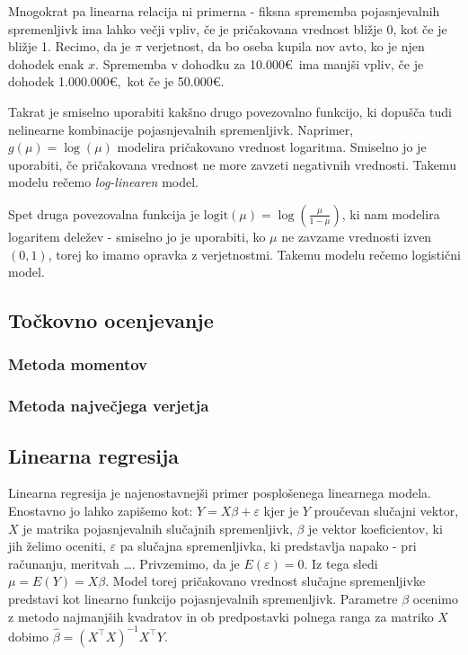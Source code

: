 \documentclass[12pt,a4paper]{amsart}
\theoremstyle{definition} %
\theoremstyle{plain} %
\begin{document}
Mnogokrat pa linearna relacija ni primerna - fiksna sprememba pojasnjevalnih spremenljivk ima lahko večji vpliv, če je pričakovana vrednost 
bližje 0, kot če je bližje 1. Recimo, da je $\pi$ verjetnost, da bo oseba kupila nov avto, ko je njen dohodek enak $x$. Sprememba v dohodku
za 10.000\euro~ima manjši vpliv, če je dohodek 1.000.000\euro,~kot če je 50.000\euro.

Takrat je smiselno uporabiti kakšno drugo povezovalno funkcijo, ki dopušča tudi nelinearne kombinacije pojasnjevalnih
spremenljivk. Naprimer, $g(\mu) = \log(\mu)$ modelira
pričakovano vrednost logaritma. Smiselno jo je uporabiti, če pričakovana vrednost ne more zavzeti negativnih vrednosti. Takemu modelu rečemo
\textit{log-linearen} model.

Spet druga povezovalna funkcija je $\mathrm{logit}(\mu) = \log(\frac{\mu}{1-\mu})$, ki nam modelira logaritem deležev - smiselno jo je uporabiti, 
ko $\mu$ ne zavzame vrednosti izven $(0,1)$, torej ko imamo opravka z verjetnostmi. Takemu modelu rečemo logistični model.

\subsection{Točkovno ocenjevanje}
\subsubsection{Metoda momentov}
\subsubsection{Metoda največjega verjetja}
\subsection{Linearna regresija}

Linearna regresija je najenostavnejši primer posplošenega linearnega modela. Enostavno jo lahko zapišemo kot:
$
    Y = X \beta + \varepsilon
$
kjer je $Y$ proučevan slučajni vektor, $X$ je matrika pojasnjevalnih slučajnih spremenljivk, $\beta$ je vektor koeficientov, ki jih želimo oceniti,
$\varepsilon$ pa slučajna spremenljivka, ki predstavlja napako - pri računanju, meritvah \ldots. Privzemimo, da je $E(\varepsilon) = 0$. Iz tega sledi
$\mu = E(Y) = X\beta$. Model torej pričakovano vrednost slučajne spremenljivke predstavi kot linearno funkcijo pojasnjevalnih spremenljivk.
Parametre $\beta$ ocenimo z metodo najmanjših kvadratov in ob predpostavki polnega ranga za matriko $X$ dobimo $\hat{\beta} =  (X^\top X)^{-1}
X^\top Y$. 
\end{document}
